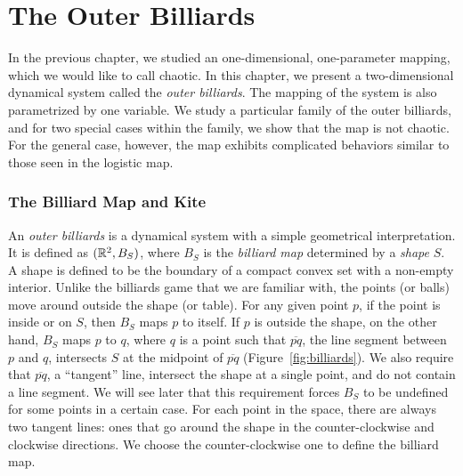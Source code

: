 \documentclass[10pt,twoside]{book}
\begin{document}
\label{chap:billiards}
\chapter{The Outer Billiards}
In the previous chapter, we studied an one-dimensional, one-parameter mapping, which we would like to call chaotic.
In this chapter, we present a two-dimensional dynamical system called the \textit{outer billiards}.
The mapping of the system is also parametrized by one variable. 
We study a particular family of the outer billiards, and for two special cases within the family, we show that the map is not chaotic.
For the general case, however, the map exhibits complicated behaviors similar to those seen in the logistic map.

\subsection*{The Billiard Map and Kite}
An \textit{outer billiards} is a dynamical system with a simple geometrical interpretation.
It is defined as $(\mathbb{R}^2, B_S)$, where $B_S$ is the \textit{billiard map} determined by a \textit{shape} $S$.
A shape is defined to be the boundary of a compact convex set with a non-empty interior.
Unlike the billiards game that we are familiar with, the points (or balls) move around outside the shape (or table).
For any given point $p$, if the point is inside or on $S$, then $B_S$ maps $p$ to itself.
If $p$ is outside the shape, on the other hand, $B_S$ maps $p$ to $q$, where $q$ is a point such that $\overline{pq}$, the line segment between $p$ and $q$, intersects $S$ at the midpoint of $\overline{pq}$ (Figure~\ref{fig:billiards}).
We also require that $\overline{pq}$, a ``tangent'' line, intersect the shape at a single point, and do not contain a line segment.
We will see later that this requirement forces $B_S$ to be undefined for some points in a certain case.
For each point in the space, there are always two tangent lines: ones that go around the shape in the counter-clockwise and clockwise directions.
We choose the counter-clockwise one to define the billiard map.
\end{document}
